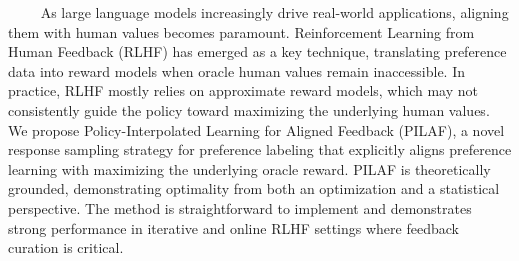 
~~~~ As large language models increasingly drive real-world applications, aligning them with human values becomes paramount. Reinforcement Learning from Human Feedback (RLHF) has emerged as a key technique, translating preference data into reward models when oracle human values remain inaccessible. In practice, RLHF mostly relies on approximate reward models, which may not consistently guide the policy toward maximizing the underlying human values. We propose Policy-Interpolated Learning for Aligned Feedback (PILAF), a novel response sampling strategy for preference labeling that explicitly aligns preference learning with maximizing the underlying oracle reward. PILAF is theoretically grounded, demonstrating optimality from  both an optimization and a statistical perspective. The method is straightforward to implement and demonstrates strong performance in iterative and online RLHF settings where feedback curation is critical.